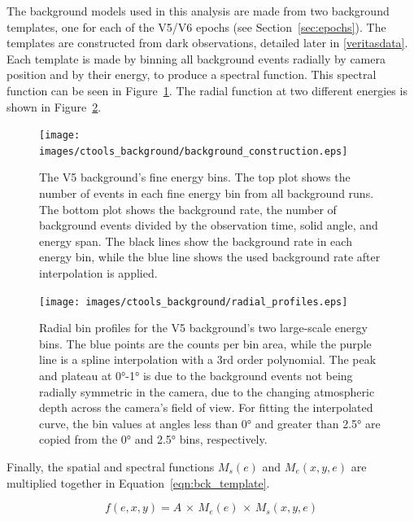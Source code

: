     The background models used in this analysis are made from two background templates, one for each of the V5/V6 epochs (see Section~\ref{sec:epochs}).
    The templates are constructed from dark observations, detailed later in \ref{veritasdata}.
    Each template is made by binning all background events radially by camera position and by their energy, to produce a spectral function.
    This spectral function can be seen in Figure~\ref{fig:background_profile}.
    The radial function at two different energies is shown in Figure~\ref{fig:background_radial}.

    \begin{figure}[!p]
      \centering
      \texttt{[image: images/ctools\_background/background\_construction.eps]}
      \caption[CTOOLS Background Fine Energy Bins]{
        The V5 background's fine energy bins.
        The top plot shows the number of events in each fine energy bin from all background runs.
        The bottom plot shows the background rate, the number of background events divided by the observation time, solid angle, and energy span.
        The black lines show the background rate in each energy bin, while the blue line shows the used background rate after interpolation is applied.
      }
      \label{fig:background_profile}
    \end{figure}

    \begin{figure}[!hb]
      \centering
      \texttt{[image: images/ctools\_background/radial\_profiles.eps]}
      \caption[CTOOLS Radial Background Profiles]{
        Radial bin profiles for the V5 background's two large-scale energy bins.
        The blue points are the counts per bin area, while the purple line is a spline interpolation with a 3rd order polynomial.
        The peak and plateau at \ang{0}-\ang{1} is due to the background events not being radially symmetric in the camera, due to the changing atmospheric depth across the camera's field of view.
        For fitting the interpolated curve, the bin values at angles less than \ang{0} and greater than \ang{2.5} are copied from the \ang{0} and \ang{2.5} bins, respectively.
        }
      \label{fig:background_radial}
    \end{figure}
    
    Finally, the spatial and spectral functions $M_{s} \left ( e \right )$ and $M_e \left(x,y,e \right )$ are multiplied together in Equation~\ref{eqn:bck_template}.
    
    \begin{equation}\label{eqn:bck_template}
      f(e,x,y) = A \, \times \, M_{e} \left ( e \right ) \, \times \, M_{s} \left ( x, y, e \right )
    \end{equation} 
    

